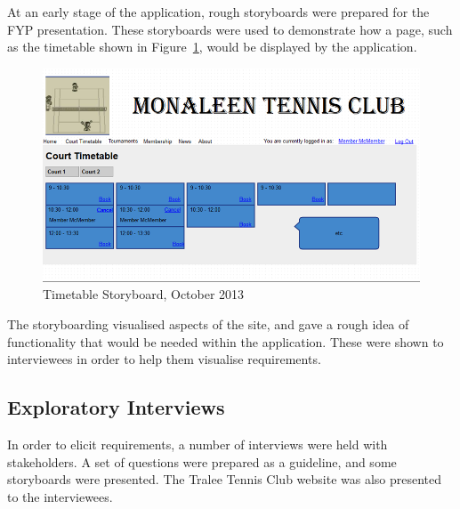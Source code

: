 At an early stage of the application, rough storyboards were prepared for the FYP presentation. These storyboards were used to demonstrate how a page, such as the timetable shown in Figure~\ref{fig:timetableSB}, would be displayed by the application.

\begin{figure}[H]
\begin{center}
\includegraphics[width=14cm]{storyboard.png}
\end{center}
\caption{Timetable Storyboard, October 2013}
\label{fig:timetableSB}
\end{figure}

The storyboarding visualised aspects of the site, and gave a rough idea of functionality that would be needed within the application. These were shown to interviewees in order to help them visualise requirements.

\subsection{Exploratory Interviews}

In order to elicit requirements, a number of interviews were held with stakeholders. A set of questions were prepared as a guideline, and some storyboards were presented. The Tralee Tennis Club website was also presented to the interviewees.

